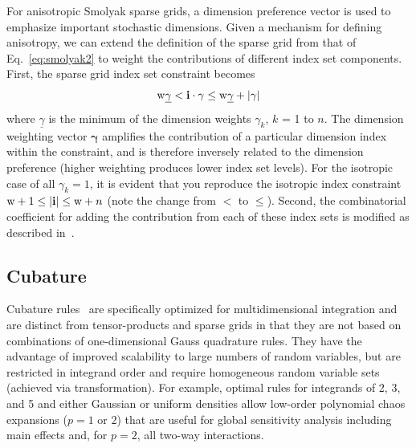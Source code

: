 For anisotropic Smolyak sparse grids, a dimension preference vector is
used to emphasize important stochastic dimensions.  
Given a mechanism for defining anisotropy, we can extend the
definition of the sparse grid from that of Eq.~\ref{eq:smolyak2} to
weight the contributions of different index set components.  First,
the sparse grid index set constraint becomes
\begin{equation}
{\rm w}\underline{\gamma} < \mathbf{i} \cdot \mathbf{\gamma} \leq 
{\rm w}\underline{\gamma}+|\mathbf{\gamma}|
\label{eq:aniso_smolyak_constr}
\end{equation}
where $\underline{\gamma}$ is the minimum of the dimension weights
$\gamma_k$, $k$ = 1 to $n$.  The dimension weighting vector
$\mathbf{\gamma}$ amplifies the contribution of a particular dimension
index within the constraint, and is therefore inversely related to the
dimension preference (higher weighting produces lower index set
levels).  For the isotropic case of all $\gamma_k = 1$, it is evident
that you reproduce the isotropic index constraint ${\rm w}+1 \leq
|\mathbf{i}| \leq {\rm w}+n$ (note the change from $<$ to $\leq$).
Second, the combinatorial coefficient for adding the contribution from
each of these index sets is modified as described in~\cite{Burk09}.


\subsection{Cubature} \label{uq:expansion:cubature}

Cubature rules~\cite{stroud,xiu_cubature} are specifically optimized
for multidimensional integration and are distinct from tensor-products 
and sparse grids in that they are not based on combinations of 
one-dimensional Gauss quadrature rules.  They have the advantage of 
improved scalability to large numbers of random variables, but are 
restricted in integrand order and require homogeneous random variable 
sets (achieved via transformation).  For example, optimal rules for
integrands of 2, 3, and 5 and either Gaussian or uniform densities 
allow low-order polynomial chaos expansions ($p=1$ or $2$) that are 
useful for global sensitivity analysis including main effects and, 
for $p=2$, all two-way interactions.


